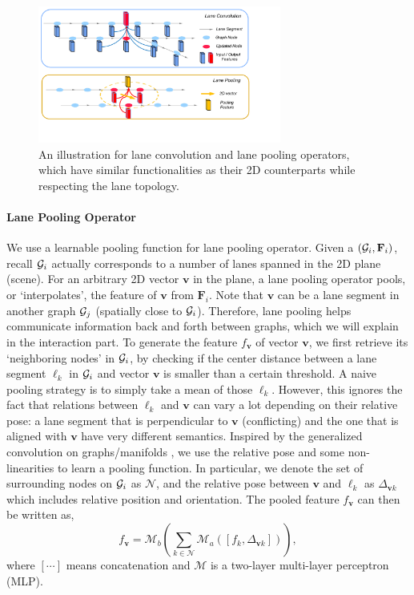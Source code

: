 \begin{figure}[t]
\begin{center}
  \includegraphics[height=4.5cm]{figures/operator.pdf}
\end{center}
\vspace{-0.2cm}
\caption{An illustration for lane convolution and lane
pooling operators, which have similar functionalities as their 2D counterparts
while respecting the lane topology.}
\label{fig:operator}
\end{figure}


\paragraph{Lane Pooling Operator}
We use a learnable pooling function for lane pooling operator.
Given a \ROI
$(\mathcal{G}_i, \mathbf{F}_i)$, recall $\mathcal{G}_i$ actually corresponds to a number of
lanes spanned in the 2D plane (scene). For an arbitrary 2D vector
$\mathbf{v}$ in the plane, a lane pooling operator pools, or `interpolates',
the feature of $\mathbf{v}$ from $\mathbf{F}_i$. Note that
$\mathbf{v}$ can be a lane segment in another graph $\mathcal{G}_j$ (spatially
close to $\mathcal{G}_i$). Therefore, lane pooling helps
communicate information back and forth between graphs, which we will explain in the interaction part.
To generate the feature $f_\mathbf{v}$ of vector $\mathbf{v}$, we first retrieve
its `neighboring nodes' in $\mathcal{G}_i$, by checking if the center distance between a lane segment
$\ell_k$ in $\mathcal{G}_i$ and vector $\mathbf{v}$ is smaller than a certain threshold. A naive
pooling strategy is to simply take a mean of those $\ell_k$. However, this
ignores the fact that relations between $\ell_k$ and $\mathbf{v}$ can vary a lot
depending on their relative pose: a lane segment that is perpendicular to
$\mathbf{v}$ (conflicting) and the one that is aligned with $\mathbf{v}$
have very different semantics. Inspired by the generalized convolution on graphs/manifolds
\cite{monti2017geometric, contconv, lgn}, we use the relative pose and some non-linearities to
learn a pooling function. In particular, we denote the set of surrounding
nodes on $\mathcal{G}_i$ as $\mathcal{N}$, and the relative pose between $\mathbf{v}$ and
$\ell_k$ as $\Delta_{\mathbf{v}k}$ which includes relative position and
orientation. The pooled feature $f_{\mathbf{v}}$ can then be written as,
\begin{equation}
  \label{eq:pool}
  f_{\mathbf{v}} = \mathcal{M}_b\left(\sum_{k\in \mathcal{N}}
    \mathcal{M}_a\left(\left[
        f_k, \Delta_{\mathbf{v}k}
\right]\right)\right),
\end{equation}
where $[\cdots]$ means concatenation and $\mathcal{M}$
is a two-layer multi-layer perceptron (MLP).



